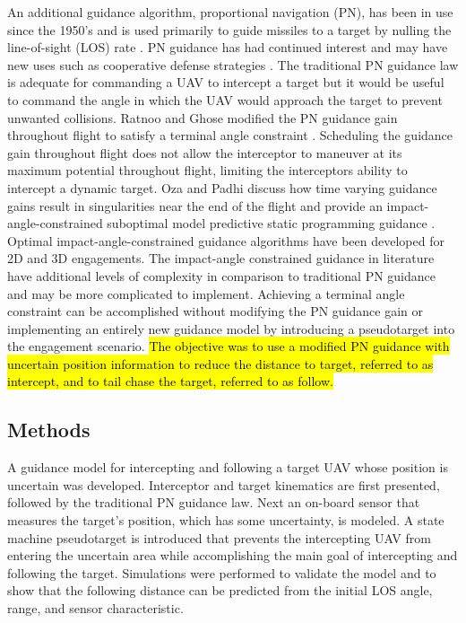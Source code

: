 \documentclass[conference]{IEEEtran}
\begin{document}
An additional guidance algorithm, proportional navigation (PN), has been in use since the 1950's \cite{zarchan} and is used primarily to guide missiles to a target by nulling the line-of-sight (LOS) rate \cite{shneydor1998missile,yanushevsky2007modern}. PN guidance has had continued interest and may have new uses such as cooperative defense strategies \cite{isaac}. The traditional PN guidance law is adequate for commanding a UAV to intercept a target but it would be useful to command the angle in which the UAV would approach the target to prevent unwanted collisions. Ratnoo and Ghose modified the PN guidance gain throughout flight to satisfy a terminal angle constraint \cite{ratnoo2009satisfying}. Scheduling the guidance gain throughout flight does not allow the interceptor to maneuver at its maximum potential throughout flight, limiting the interceptors ability to intercept a dynamic target. Oza and Padhi discuss how time varying guidance gains result in singularities near the end of the flight and provide an impact-angle-constrained suboptimal model predictive static programming guidance \cite{oza2012impact}. Optimal impact-angle-constrained guidance algorithms have been developed for 2D \cite{park2013optimal} and 3D \cite{kumar2014three} engagements. The impact-angle constrained guidance in literature have additional levels of complexity in comparison to traditional PN guidance and may be more complicated to implement. Achieving a terminal angle constraint can be accomplished without modifying the PN guidance gain or implementing an entirely new guidance model by introducing a pseudotarget into the engagement scenario.\hl{ The objective was to use a modified PN guidance with uncertain position information to reduce the distance to target, referred to as intercept, and to tail chase the target, referred to as follow.}




\subsection{Methods}
A guidance model for intercepting and following a target UAV whose position is uncertain was developed. 
Interceptor and target kinematics are first presented, followed by the traditional PN guidance law. Next an on-board sensor that measures the target's position, which has some uncertainty, is modeled. A state machine pseudotarget is introduced that prevents the intercepting UAV from entering the uncertain area while accomplishing the main goal of intercepting and following the target. Simulations were performed to validate the model and to show that the following distance can be predicted from the initial LOS angle, range, and sensor characteristic.
\end{document}
